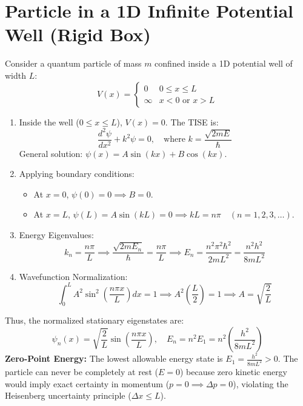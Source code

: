 \section{Particle in a 1D Infinite Potential Well (Rigid Box)}
Consider a quantum particle of mass $m$ confined inside a 1D potential well of width $L$:
\begin{equation}
V(x) = \begin{cases} 0 & 0 \le x \le L \\ \infty & x < 0 \text{ or } x > L \end{cases}
\end{equation}
\begin{enumerate}[leftmargin=*,itemsep=3pt]
    \item Inside the well ($0 \le x \le L$), $V(x) = 0$. The TISE is:
    \begin{equation}
    \frac{d^2\psi}{dx^2} + k^2\psi = 0, \quad \text{where } k = \frac{\sqrt{2mE}}{\hbar}
    \end{equation}
    General solution: $\psi(x) = A\sin(kx) + B\cos(kx)$.
    \item Applying boundary conditions:
    \begin{itemize}
        \item At $x = 0$, $\psi(0) = 0 \implies B = 0$.
        \item At $x = L$, $\psi(L) = A\sin(kL) = 0 \implies kL = n\pi \quad (n = 1, 2, 3, \dots)$.
    \end{itemize}
    \item Energy Eigenvalues:
    \begin{equation}
    k_n = \frac{n\pi}{L} \implies \frac{\sqrt{2mE_n}}{\hbar} = \frac{n\pi}{L} \implies E_n = \frac{n^2 \pi^2 \hbar^2}{2m L^2} = \frac{n^2 h^2}{8m L^2}
    \end{equation}
    \item Wavefunction Normalization:
    \begin{equation}
    \int_0^L A^2 \sin^2\left(\frac{n\pi x}{L}\right)dx = 1 \implies A^2\left(\frac{L}{2}\right) = 1 \implies A = \sqrt{\frac{2}{L}}
    \end{equation}
\end{enumerate}
Thus, the normalized stationary eigenstates are:
\begin{equation}
\psi_n(x) = \sqrt{\frac{2}{L}}\sin\left(\frac{n\pi x}{L}\right), \quad E_n = n^2 E_1 = n^2 \left(\frac{h^2}{8m L^2}\right)
\end{equation}
\textbf{Zero-Point Energy:} The lowest allowable energy state is $E_1 = \frac{h^2}{8mL^2} > 0$. The particle can never be completely at rest ($E = 0$) because zero kinetic energy would imply exact certainty in momentum ($p=0 \implies \Delta p = 0$), violating the Heisenberg uncertainty principle ($\Delta x \le L$).


